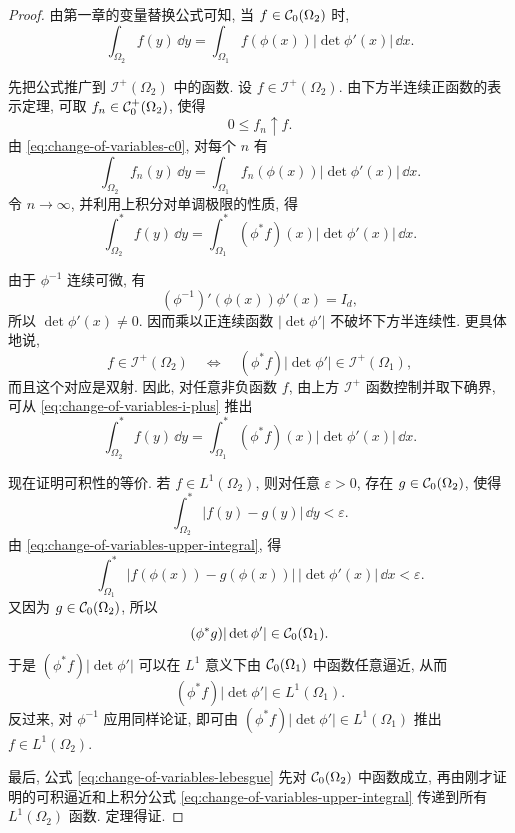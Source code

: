 \begin{proof}
	由第一章的变量替换公式可知, 当 \(f\in\mathcal{C}_0(\Omega_2)\) 时,
	\begin{equation}
		\int_{\Omega_2}f(y)\,\dd y
		=
		\int_{\Omega_1}f(\phi(x))|\det\phi'(x)|\,\dd x.
		\label{eq:change-of-variables-c0}
	\end{equation}
	
	先把公式推广到 \(\mathcal I^+(\Omega_2)\) 中的函数. 设 \(f\in\mathcal I^+(\Omega_2)\). 由下方半连续正函数的表示定理, 可取 \(f_n\in\mathcal{C}_0^+(\Omega_2)\), 使得
	\[
	0\leq f_n\uparrow f.
	\]
	由 \eqref{eq:change-of-variables-c0}, 对每个 \(n\) 有
	\[
	\int_{\Omega_2}f_n(y)\,\dd y
	=
	\int_{\Omega_1}f_n(\phi(x))|\det\phi'(x)|\,\dd x.
	\]
	令 \(n\to\infty\), 并利用上积分对单调极限的性质, 得
	\begin{equation}
		\int_{\Omega_2}^{*}f(y)\,\dd y
		=
		\int_{\Omega_1}^{*}(\phi^*f)(x)|\det\phi'(x)|\,\dd x.
		\label{eq:change-of-variables-i-plus}
	\end{equation}
	
	由于 \(\phi^{-1}\) 连续可微, 有
	\[
	(\phi^{-1})'(\phi(x))\phi'(x)=I_d,
	\]
	所以 \(\det\phi'(x)\neq0\). 因而乘以正连续函数 \(|\det\phi'|\) 不破坏下方半连续性. 更具体地说,
	\[
	f\in\mathcal I^+(\Omega_2)
	\quad\Longleftrightarrow\quad
	(\phi^*f)|\det\phi'|\in\mathcal I^+(\Omega_1),
	\]
	而且这个对应是双射. 因此, 对任意非负函数 \(f\), 由上方 \(\mathcal I^+\) 函数控制并取下确界, 可从 \eqref{eq:change-of-variables-i-plus} 推出
	\begin{equation}
		\int_{\Omega_2}^{*}f(y)\,\dd y
		=
		\int_{\Omega_1}^{*}(\phi^*f)(x)|\det\phi'(x)|\,\dd x.
		\label{eq:change-of-variables-upper-integral}
	\end{equation}
	
	现在证明可积性的等价. 若 \(f\in L^1(\Omega_2)\), 则对任意 \(\varepsilon>0\), 存在 \(g\in\mathcal{C}_0(\Omega_2)\), 使得
	\[
	\int_{\Omega_2}^{*}|f(y)-g(y)|\,\dd y<\varepsilon.
	\]
	由 \eqref{eq:change-of-variables-upper-integral}, 得
	\[
	\int_{\Omega_1}^{*}|f(\phi(x))-g(\phi(x))|\,|\det\phi'(x)|\,\dd x<\varepsilon.
	\]
	又因为 \(g\in\mathcal{C}_0(\Omega_2)\), 所以
	\[
	(\phi^*g)|\det\phi'|\in\mathcal{C}_0(\Omega_1).
	\]
	于是 \((\phi^*f)|\det\phi'|\) 可以在 \(L^1\) 意义下由 \(\mathcal{C}_0(\Omega_1)\) 中函数任意逼近, 从而
	\[
	(\phi^*f)|\det\phi'|\in L^1(\Omega_1).
	\]
	反过来, 对 \(\phi^{-1}\) 应用同样论证, 即可由 \((\phi^*f)|\det\phi'|\in L^1(\Omega_1)\) 推出 \(f\in L^1(\Omega_2)\).
	
	最后, 公式 \eqref{eq:change-of-variables-lebesgue} 先对 \(\mathcal{C}_0(\Omega_2)\) 中函数成立, 再由刚才证明的可积逼近和上积分公式 \eqref{eq:change-of-variables-upper-integral} 传递到所有 \(L^1(\Omega_2)\) 函数. 定理得证.
\end{proof}

